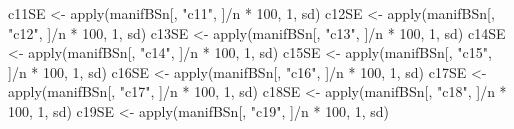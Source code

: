 \documentclass[
]{article}
\newenvironment{Shaded}{\begin{snugshade}}{\end{snugshade}}
\newcommand{\DecValTok}[1]{\textcolor[rgb]{0.00,0.00,0.81}{#1}}
\newcommand{\FunctionTok}[1]{\textcolor[rgb]{0.00,0.00,0.00}{#1}}
\newcommand{\NormalTok}[1]{#1}
\newcommand{\OtherTok}[1]{\textcolor[rgb]{0.56,0.35,0.01}{#1}}
\newcommand{\SpecialCharTok}[1]{\textcolor[rgb]{0.00,0.00,0.00}{#1}}
\newcommand{\StringTok}[1]{\textcolor[rgb]{0.31,0.60,0.02}{#1}}
\begin{document}
\begin{Shaded}
\begin{Highlighting}[]
\NormalTok{c11SE }\OtherTok{\textless{}{-}} \FunctionTok{apply}\NormalTok{(manifBSn[, }\StringTok{"c11"}\NormalTok{, ]}\SpecialCharTok{/}\NormalTok{n }\SpecialCharTok{*} \DecValTok{100}\NormalTok{, }\DecValTok{1}\NormalTok{, sd)}
\NormalTok{c12SE }\OtherTok{\textless{}{-}} \FunctionTok{apply}\NormalTok{(manifBSn[, }\StringTok{"c12"}\NormalTok{, ]}\SpecialCharTok{/}\NormalTok{n }\SpecialCharTok{*} \DecValTok{100}\NormalTok{, }\DecValTok{1}\NormalTok{, sd)}
\NormalTok{c13SE }\OtherTok{\textless{}{-}} \FunctionTok{apply}\NormalTok{(manifBSn[, }\StringTok{"c13"}\NormalTok{, ]}\SpecialCharTok{/}\NormalTok{n }\SpecialCharTok{*} \DecValTok{100}\NormalTok{, }\DecValTok{1}\NormalTok{, sd)}
\NormalTok{c14SE }\OtherTok{\textless{}{-}} \FunctionTok{apply}\NormalTok{(manifBSn[, }\StringTok{"c14"}\NormalTok{, ]}\SpecialCharTok{/}\NormalTok{n }\SpecialCharTok{*} \DecValTok{100}\NormalTok{, }\DecValTok{1}\NormalTok{, sd)}
\NormalTok{c15SE }\OtherTok{\textless{}{-}} \FunctionTok{apply}\NormalTok{(manifBSn[, }\StringTok{"c15"}\NormalTok{, ]}\SpecialCharTok{/}\NormalTok{n }\SpecialCharTok{*} \DecValTok{100}\NormalTok{, }\DecValTok{1}\NormalTok{, sd)}
\NormalTok{c16SE }\OtherTok{\textless{}{-}} \FunctionTok{apply}\NormalTok{(manifBSn[, }\StringTok{"c16"}\NormalTok{, ]}\SpecialCharTok{/}\NormalTok{n }\SpecialCharTok{*} \DecValTok{100}\NormalTok{, }\DecValTok{1}\NormalTok{, sd)}
\NormalTok{c17SE }\OtherTok{\textless{}{-}} \FunctionTok{apply}\NormalTok{(manifBSn[, }\StringTok{"c17"}\NormalTok{, ]}\SpecialCharTok{/}\NormalTok{n }\SpecialCharTok{*} \DecValTok{100}\NormalTok{, }\DecValTok{1}\NormalTok{, sd)}
\NormalTok{c18SE }\OtherTok{\textless{}{-}} \FunctionTok{apply}\NormalTok{(manifBSn[, }\StringTok{"c18"}\NormalTok{, ]}\SpecialCharTok{/}\NormalTok{n }\SpecialCharTok{*} \DecValTok{100}\NormalTok{, }\DecValTok{1}\NormalTok{, sd)}
\NormalTok{c19SE }\OtherTok{\textless{}{-}} \FunctionTok{apply}\NormalTok{(manifBSn[, }\StringTok{"c19"}\NormalTok{, ]}\SpecialCharTok{/}\NormalTok{n }\SpecialCharTok{*} \DecValTok{100}\NormalTok{, }\DecValTok{1}\NormalTok{, sd)}


\end{Highlighting}
\end{Shaded}
\end{document}
